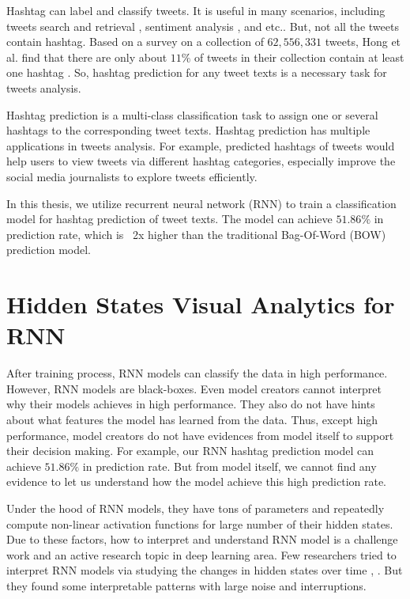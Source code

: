 Hashtag can label and classify tweets. It is useful in many scenarios, including tweets search and retrieval \cite{Efron2010}, sentiment analysis \cite{Davidov2010}, and etc.. But, not all the tweets contain hashtag. Based on a survey on a collection of $62,556,331$ tweets, Hong et al. find that there are only about $11\%$ of tweets in their collection contain at least one hashtag \cite{Hong2011a}. So, hashtag prediction for any tweet texts is a necessary task for tweets analysis. 

Hashtag prediction is a multi-class classification task to assign one or several hashtags to the corresponding tweet texts. Hashtag prediction has multiple applications in tweets analysis.  For example, predicted hashtags of tweets would help users to view tweets via different hashtag categories, especially improve the social media journalists to explore tweets efficiently. 

In this thesis, we utilize recurrent neural network (RNN) to train a classification model for hashtag prediction of tweet texts. The model can achieve $51.86\%$ in prediction rate, which is ~2x higher than the traditional Bag-Of-Word (BOW) prediction model.

\section{Hidden States Visual Analytics for RNN}

After training process, RNN models can classify the data in high performance. However, RNN models are black-boxes. Even model creators cannot interpret why their models achieves in high performance. They also do not have hints about what features the model has learned from the data. Thus, except high performance, model creators do not have evidences from model itself to support their decision making.  For example, our RNN hashtag prediction model can achieve $51.86\%$ in prediction rate. But from model itself, we cannot find any evidence to let us understand how the model achieve this high prediction rate. 

Under the hood of RNN models, they have tons of parameters and repeatedly compute non-linear activation functions for large number of their hidden states. Due to these factors, how to interpret and understand RNN model is a challenge work and an active research topic in deep learning area. Few researchers tried to interpret RNN models via studying the changes in hidden states over time \cite{Strobelt2016} \cite{Li2016}, . But they found some interpretable patterns with large noise and interruptions. 

